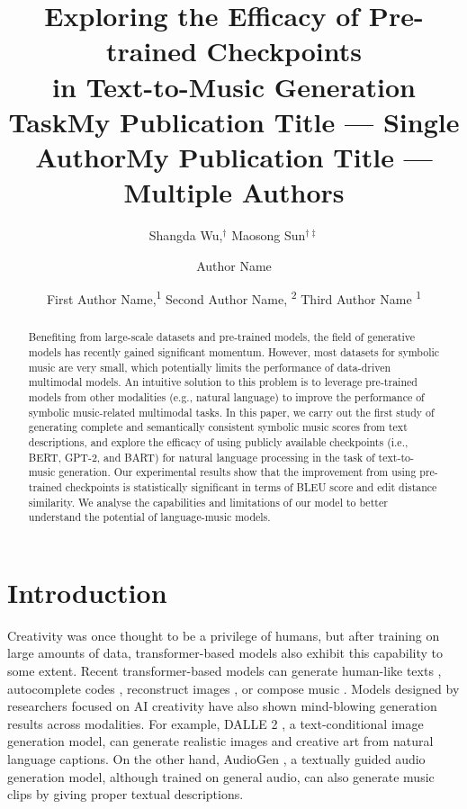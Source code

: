 \documentclass[letterpaper]{article} %
\title{Exploring the Efficacy of Pre-trained Checkpoints \\ in Text-to-Music Generation Task}
\author {
Shangda Wu,$^{\dagger}$
Maosong Sun$^{\dagger\ddagger}$
}
\title{My Publication Title --- Single Author}
\author {
Author Name
}
\title{My Publication Title --- Multiple Authors}
\author {
First Author Name,\textsuperscript{\rm 1}
Second Author Name, \textsuperscript{\rm 2}
Third Author Name \textsuperscript{\rm 1}
}
\begin{document}
\maketitle

\begin{abstract}
Benefiting from large-scale datasets and pre-trained models, the field of generative models has recently gained significant momentum. However, most datasets for symbolic music are very small, which potentially limits the performance of data-driven multimodal models. An intuitive solution to this problem is to leverage pre-trained models from other modalities (e.g., natural language) to improve the performance of symbolic music-related multimodal tasks. In this paper, we carry out the first study of generating complete and semantically consistent symbolic music scores from text descriptions, and explore the efficacy of using publicly available checkpoints (i.e., BERT, GPT-2, and BART) for natural language processing in the task of text-to-music generation. Our experimental results show that the improvement from using pre-trained checkpoints is statistically significant in terms of BLEU score and edit distance similarity. We analyse the capabilities and limitations of our model to better understand the potential of language-music models.
\end{abstract}

\section{Introduction}
Creativity was once thought to be a privilege of humans, but after training on large amounts of data, transformer-based models \cite{DBLP:conf/nips/VaswaniSPUJGKP17} also exhibit this capability to some extent. Recent transformer-based models can generate human-like texts \cite{DBLP:conf/nips/BrownMRSKDNSSAA20}, autocomplete codes \cite{DBLP:journals/corr/abs-2107-03374}, reconstruct images \cite{DBLP:conf/cvpr/HeCXLDG22}, or compose music \cite{DBLP:journals/corr/abs-2005-00341}. Models designed by researchers focused on AI creativity have also shown mind-blowing generation results across modalities. For example, DALLE 2 \cite{DBLP:journals/corr/abs-2204-06125}, a text-conditional image generation model, can generate realistic images and creative art from natural language captions. On the other hand, AudioGen \cite{DBLP:journals/corr/abs-2209-15352}, a textually guided audio generation model, although trained on general audio, can also generate music clips by giving proper textual descriptions.
\end{document}
